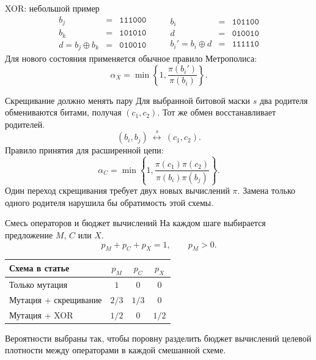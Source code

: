 \documentclass[aspectratio=169,11pt]{beamer}
\begin{document}
\begin{frame}{XOR: небольшой пример}
  \[
    \begin{array}{rcl}
      b_j&=&\mathtt{111000}\\
      b_k&=&\mathtt{101010}\\ \hline
      d=b_j\oplus b_k&=&\mathtt{010010}
    \end{array}
    \qquad
    \begin{array}{rcl}
      b_i&=&\mathtt{101100}\\
      d&=&\mathtt{010010}\\ \hline
      b_i'=b_i\oplus d&=&\mathtt{111110}
    \end{array}
  \]
  \vspace{0.4cm}
  Для нового состояния применяется обычное правило Метрополиса:
  \[
    \alpha_X=\min\left\{1,\frac{\pi(b_i')}{\pi(b_i)}\right\}.
  \]
\end{frame}

\begin{frame}{Скрещивание должно менять пару}
  Для выбранной битовой маски $s$ два родителя обмениваются битами,
  получая $(c_1,c_2)$. Тот же обмен восстанавливает родителей.
  \[
    (b_i,b_j)\ \overset{s}{\longleftrightarrow}\ (c_1,c_2).
  \]
  Правило принятия для расширенной цепи:
  \[
    \alpha_C
    =\min\left\{
      1,\frac{\pi(c_1)\pi(c_2)}
              {\pi(b_i)\pi(b_j)}
    \right\}.
  \]
  \vspace{0.18cm}
  Один переход скрещивания требует двух новых вычислений $\pi$.
  Замена только одного родителя нарушила бы обратимость этой схемы.
\end{frame}

\begin{frame}{Смесь операторов и бюджет вычислений}
  На каждом шаге выбирается предложение $M$, $C$ или $X$.
  \[
    p_M+p_C+p_X=1,\qquad p_M>0.
  \]
  \vspace{0.15cm}
  \begin{center}
  \begin{tabular}{lccc}
    \toprule
    Схема в статье & $p_M$ & $p_C$ & $p_X$\\
    \midrule
    Только мутация & $1$ & $0$ & $0$\\
    Мутация + скрещивание & $2/3$ & $1/3$ & $0$\\
    Мутация + XOR & $1/2$ & $0$ & $1/2$\\
    \bottomrule
  \end{tabular}
  \end{center}
  \vspace{0.2cm}
  Вероятности выбраны так, чтобы поровну разделить бюджет вычислений
  целевой плотности между операторами в каждой смешанной схеме.
\end{frame}
\end{document}
